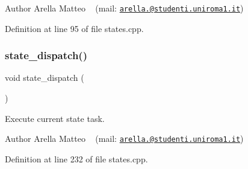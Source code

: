 \begin{DoxyAuthor}{Author}
Arella Matteo ~\newline
 (mail\+: \href{mailto:arella.1646983@studenti.uniroma1.it}{\tt arella.@studenti.\+uniroma1.\+it}) 
\end{DoxyAuthor}


Definition at line 95 of file states.\+cpp.

\mbox{\label{group__stages__group_gac534eb879fa26941a06ffadeb69d92ff}} 
\subsubsection{\texorpdfstring{state\+\_\+dispatch()}{state\_dispatch()}}
{\footnotesize\ttfamily void state\+\_\+dispatch (\begin{DoxyParamCaption}{ }\end{DoxyParamCaption})}



Execute current state task. 

\begin{DoxyAuthor}{Author}
Arella Matteo ~\newline
 (mail\+: \href{mailto:arella.1646983@studenti.uniroma1.it}{\tt arella.@studenti.\+uniroma1.\+it}) 
\end{DoxyAuthor}


Definition at line 232 of file states.\+cpp.

